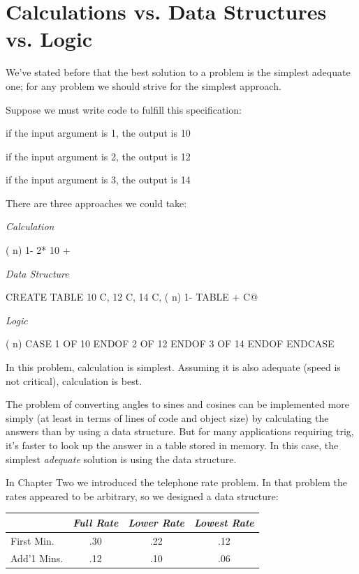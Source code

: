 \section{Calculations vs. Data Structures vs. Logic}

We've stated before that the best solution to a problem is the simplest
adequate one; for any problem we should strive for the simplest
approach.

Suppose we must write code to fulfill this specification:

\medskip
{\sf if the input argument is 1, the output is 10}

{\sf if the input argument is 2, the output is 12}

{\sf if the input argument is 3, the output is 14}

\medskip

There are three approaches we could take:

\emph{Calculation}

\begin{Code}
( n)  1-  2*  10 +
\end{Code}

\emph{Data Structure}

\begin{Code}
CREATE TABLE  10 C,  12 C,  14 C,
( n)  1- TABLE + C@
\end{Code}

\emph{Logic}

\begin{Code}
( n)  CASE
         1 OF 10 ENDOF
         2 OF 12 ENDOF
         3 OF 14 ENDOF  ENDCASE
\end{Code}
In this problem, calculation is simplest. Assuming it is also adequate
(speed is not critical), calculation is best.

The problem of converting angles to sines and cosines can be implemented
more simply (at least in terms of lines of code and object size)
by calculating the answers than by using a data structure. But for many
applications requiring trig, it's faster to look up the answer in a table
stored in memory. In this case, the simplest \emph{adequate} solution is using
the data structure.

In Chapter Two we introduced the telephone rate problem. In that
problem the rates appeared to be arbitrary, so we designed a data
structure:

\bigskip
\begin{tabular}{lccc}
          & \emph{Full Rate} & \emph{Lower Rate} & \emph{Lowest Rate} \\ \hline
First Min.  &       .30        &        .22        &          .12 \\ \hline
Add'1 Mins. &       .12        &        .10        &          .06 \\ \hline
\end{tabular}
\bigskip

